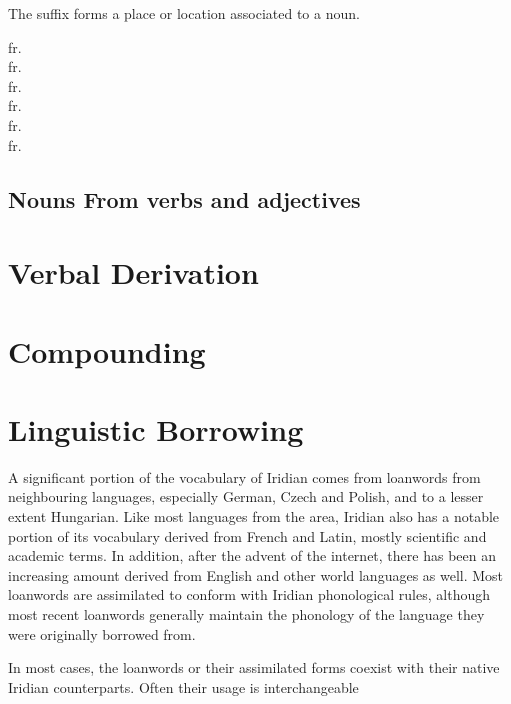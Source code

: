 The suffix  forms a place or location associated to a noun.

\ex
{} fr. \\
 fr. \\
 fr. \\
 fr. \\
 fr. \\
 fr. \\
\xe

\subsection{Nouns From verbs and adjectives}\label{sec:nomder-verb}
\section{Verbal Derivation}

\section{Compounding}\label{sec:compounding}

\section{Linguistic Borrowing}
A significant portion of the vocabulary of Iridian comes from loanwords from neighbouring languages, especially German, Czech and Polish, and to a lesser extent Hungarian. Like most languages from the area, Iridian also has a notable portion of its vocabulary derived from French and Latin, mostly scientific and academic terms. In addition, after the advent of the internet, there has been an increasing amount derived from English and other world languages as well. Most loanwords are assimilated to conform with Iridian phonological rules, although most recent loanwords generally maintain the phonology of the language they were originally borrowed from.

In most cases, the loanwords or their assimilated forms coexist with their native Iridian counterparts. Often their usage is interchangeable

